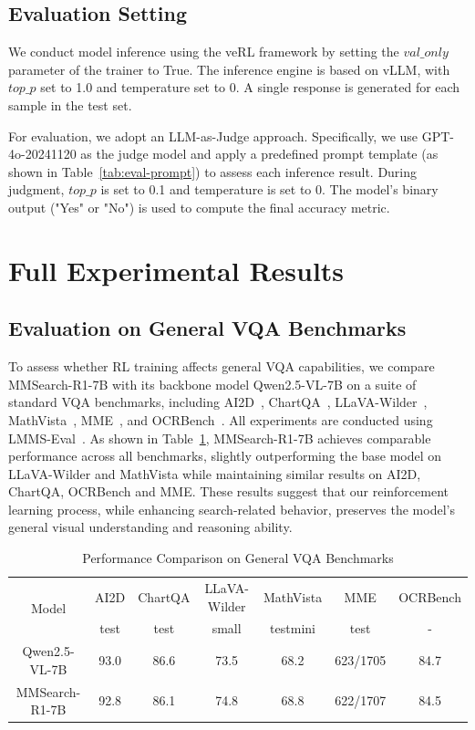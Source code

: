 \documentclass{article}
\begin{document}
\subsection{Evaluation Setting}
\label{appendix:exp-eval-setup}
We conduct model inference using the veRL framework by setting the $val\_only$ parameter of the trainer to True. The inference engine is based on vLLM, with $top\_p$ set to 1.0 and temperature set to 0. A single response is generated for each sample in the test set.

For evaluation, we adopt an LLM-as-Judge approach. Specifically, we use GPT-4o-20241120 as the judge model and apply a predefined prompt template (as shown in Table~\ref{tab:eval-prompt}) to assess each inference result. During judgment, $top\_p$ is set to 0.1 and temperature is set to 0. The model’s binary output ("Yes" or "No") is used to compute the final accuracy metric.

\section{Full Experimental Results}
\label{appendix:full-exp}
\subsection{Evaluation on General VQA Benchmarks}
To assess whether RL training affects general VQA capabilities, we compare MMSearch-R1-7B with its backbone model Qwen2.5-VL-7B on a suite of standard VQA benchmarks, including AI2D~\cite{bench/ai2d}, ChartQA~\cite{bench/chartqa}, LLaVA-Wilder~\cite{bench/llava-wilder}, MathVista~\cite{bench/mathvista}, MME~\cite{bench/mme}, and OCRBench~\cite{bench/ocrbench}. All experiments are conducted using LMMS-Eval~\cite{code/lmms-eval}. As shown in Table~\ref{tab:general-vqa}, MMSearch-R1-7B achieves comparable performance across all benchmarks, slightly outperforming the base model on LLaVA-Wilder and MathVista while maintaining similar results on AI2D, ChartQA, OCRBench and MME. These results suggest that our reinforcement learning process, while enhancing search-related behavior, preserves the model’s general visual understanding and reasoning ability.
\begin{table}[t]
\centering
\caption{Performance Comparison on General VQA Benchmarks}
\label{tab:general-vqa}
\setlength{\tabcolsep}{4pt}
\begin{tabular}{c|cccccc}
\toprule
\multirow{2}{*}{Model} & AI2D & ChartQA & LLaVA-Wilder & MathVista & MME & OCRBench \\
 & test & test & small & testmini & test & - \\ \midrule
Qwen2.5-VL-7B & 93.0 & 86.6 & 73.5 & 68.2 & 623/1705 & 84.7 \\
MMSearch-R1-7B & 92.8 & 86.1 & 74.8 & 68.8 & 622/1707 & 84.5 \\ \bottomrule
\end{tabular}
\end{table}
\end{document}
